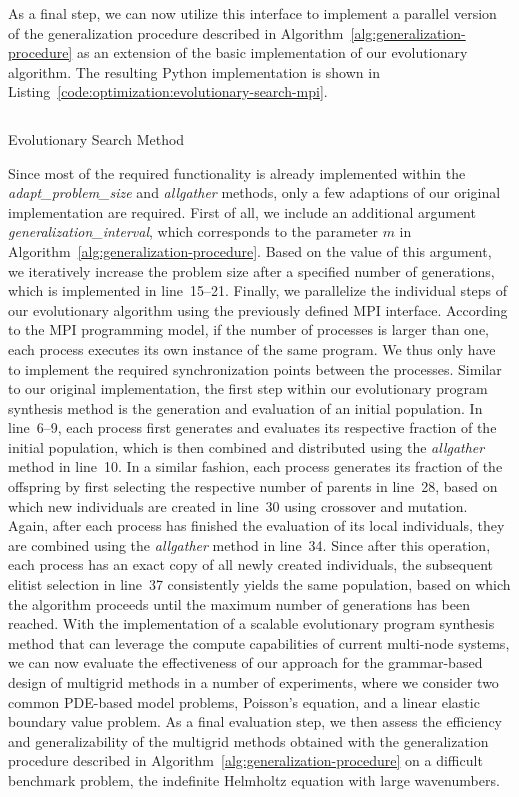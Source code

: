 As a final step, we can now utilize this interface to implement a parallel version of the generalization procedure described in Algorithm~\ref{alg:generalization-procedure} as an extension of the basic implementation of our evolutionary algorithm.
The resulting Python implementation is shown in Listing~\ref{code:optimization:evolutionary-search-mpi}.
\begin{listing}
	\inputminted[linenos]{python}{evostencils/optimization/evolutionary_search_mpi.py}
	\caption{Evolutionary Search Method}
	\label{code:optimization:evolutionary-search-mpi}
\end{listing}
Since most of the required functionality is already implemented within the \emph{adapt\_problem\_size} and \emph{allgather} methods, only a few adaptions of our original implementation are required.
First of all, we include an additional argument \emph{generalization\_interval}, which corresponds to the parameter $m$ in Algorithm~\ref{alg:generalization-procedure}.
Based on the value of this argument, we iteratively increase the problem size after a specified number of generations, which is implemented in line~15--21.
Finally, we parallelize the individual steps of our evolutionary algorithm using the previously defined MPI interface.
According to the MPI programming model, if the number of processes is larger than one, each process executes its own instance of the same program.
We thus only have to implement the required synchronization points between the processes.
Similar to our original implementation, the first step within our evolutionary program synthesis method is the generation and evaluation of an initial population.
In line~6--9, each process first generates and evaluates its respective fraction of the initial population, which is then combined and distributed using the \emph{allgather} method in line~10.
In a similar fashion, each process generates its fraction of the offspring by first selecting the respective number of parents in line~28, based on which new individuals are created in line~30 using crossover and mutation.
Again, after each process has finished the evaluation of its local individuals, they are combined using the \emph{allgather} method in line~34.
Since after this operation, each process has an exact copy of all newly created individuals, the subsequent elitist selection in line~37 consistently yields the same population, based on which the algorithm proceeds until the maximum number of generations has been reached.
With the implementation of a scalable evolutionary program synthesis method that can leverage the compute capabilities of current multi-node systems, we can now evaluate the effectiveness of our approach for the grammar-based design of multigrid methods in a number of experiments, where we consider two common PDE-based model problems, Poisson's equation, and a linear elastic boundary value problem.
As a final evaluation step, we then assess the efficiency and generalizability of the multigrid methods obtained with the generalization procedure described in Algorithm~\ref{alg:generalization-procedure} on a difficult benchmark problem, the indefinite Helmholtz equation with large wavenumbers.

